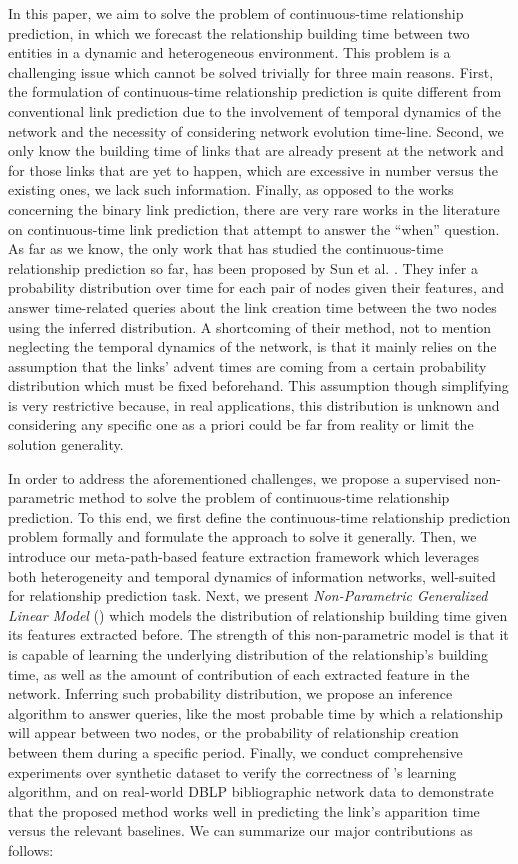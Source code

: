 In this paper, we aim to solve the problem of continuous-time relationship prediction, in which we forecast the relationship building time between two entities in a dynamic and heterogeneous environment. This problem is a challenging issue which cannot be solved trivially for three main reasons. First, the formulation of continuous-time relationship prediction is quite different from conventional link prediction due to the involvement of temporal dynamics of the network and the necessity of considering network evolution time-line. Second, we only know the building time of links that are already present at the network and for those links that are yet to happen, which are excessive in number versus the existing ones, we lack such information. Finally, as opposed to the works concerning the binary link prediction, there are very rare works in the literature on continuous-time link prediction that attempt to answer the ``when'' question. As far as we know, the only work that has studied the continuous-time relationship prediction so far, has been proposed by Sun et al. \cite{sun2012will}. 
They infer a probability distribution over time for each pair of nodes given their features, and answer time-related queries about the link creation time between the two nodes using the inferred distribution. A shortcoming of their method, not to mention neglecting the temporal dynamics of the network, is that it mainly relies on the assumption that the links' advent times are coming from a certain probability distribution which must be fixed beforehand. This assumption though simplifying is very restrictive because, in real applications, this distribution is unknown and considering any specific one as a priori could be far from reality or limit the solution generality.

In order to address the aforementioned challenges, we propose a supervised non-parametric method to solve the problem of continuous-time relationship prediction. To this end, we first define the continuous-time relationship prediction problem formally and formulate the approach to solve it generally. Then, we introduce our meta-path-based feature extraction framework which leverages both heterogeneity and temporal dynamics of information networks, well-suited for relationship prediction task. Next, we present \emph{Non-Parametric Generalized Linear Model} (\npglm) which models the distribution of relationship building time given its features extracted before. The strength of this non-parametric model is that it is capable of learning the underlying distribution of the relationship's building time, as well as the amount of contribution of each extracted feature in the network. Inferring such probability distribution, we propose an inference algorithm to answer queries, like the most probable time by which a relationship will appear between two nodes, or the probability of relationship creation between them during a specific period. Finally, we conduct comprehensive experiments over synthetic dataset to verify the correctness of \npglm's learning algorithm, and on real-world DBLP bibliographic network data to demonstrate that the proposed method works well in predicting the link's apparition time versus the relevant baselines. We can summarize our major contributions as follows:

